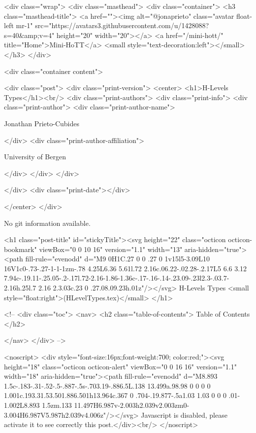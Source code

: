     <div class="wrap">
      <div class="masthead">
        <div class="container">
          <h3 class="masthead-title">
            <a href=""><img alt="@jonaprieto" class="avatar float-left mr-1" src="https://avatars3.githubusercontent.com/u/1428088?s=40&amp;v=4" height="20" width="20"></a>
            <a href="/mini-hott/" title="Home">Mini-HoTT</a>
            <small style="text-decoration:left"></small>
          </h3>
        </div>
      
      <div class="container content">
        







<div class="post">
  <div class="print-version">
    <center>
      <h1>H-Levels Types</h1><br/>
        <div class="print-authors">
          <div class="print-info">
            <div class="print-author">
              <div class="print-author-name">
                
                  Jonathan Prieto-Cubides
                
              </div>
              <div class="print-author-affiliation">
                
                  University of Bergen
                
                </div>
            </div>
          </div>
          
          
        </div>
        <div class="print-date"></div>
        
        
    </center>
  </div>

  
  No git information available.
  

  <h1 class="post-title" id="stickyTitle"><svg height="22" class="octicon octicon-bookmark" viewBox="0 0 10 16" version="1.1" width="13" aria-hidden="true"><path fill-rule="evenodd" d="M9 0H1C.27 0 0 .27 0 1v15l5-3.09L10 16V1c0-.73-.27-1-1-1zm-.78 4.25L6.36 5.61l.72 2.16c.06.22-.02.28-.2.17L5 6.6 3.12 7.94c-.19.11-.25.05-.2-.17l.72-2.16-1.86-1.36c-.17-.16-.14-.23.09-.23l2.3-.03.7-2.16h.25l.7 2.16 2.3.03c.23 0 .27.08.09.23h.01z"/></svg> H-Levels Types <small style="float:right">(HLevelTypes.tex)</small>
  </h1>

  <!-- 
  <div class="toc">
    <nav>
    <h2 class="table-of-contents"> Table of Contents </h2>
      

    </nav>
  </div>
   -->

  <noscript>
  <div style="font-size:16px;font-weight:700; color:red;"><svg height="18" class="octicon octicon-alert" viewBox="0 0 16 16" version="1.1" width="18" aria-hidden="true"><path fill-rule="evenodd" d="M8.893 1.5c-.183-.31-.52-.5-.887-.5s-.703.19-.886.5L.138 13.499a.98.98 0 0 0 0 1.001c.193.31.53.501.886.501h13.964c.367 0 .704-.19.877-.5a1.03 1.03 0 0 0 .01-1.002L8.893 1.5zm.133 11.497H6.987v-2.003h2.039v2.003zm0-3.004H6.987V5.987h2.039v4.006z"/></svg> Javascript is disabled, please activate it to see correctly this post.</div><br/>
  </noscript>

